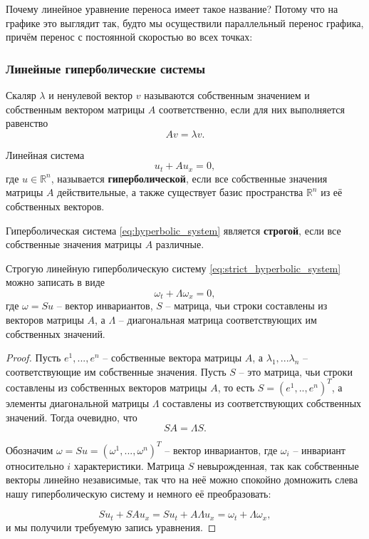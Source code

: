 \documentclass[../main.tex]{subfile}
\begin{document}
Почему линейное уравнение переноса имеет такое название? Потому что на графике
это выглядит так, будто мы осуществили параллельный перенос графика, причём
перенос с постоянной скоростью во всех точках: \\



\subsubsection{Линейные гиперболические системы}
\begin{define}
	Скаляр $\lambda$ и ненулевой вектор $v$ называются собственным
	значением и собственным вектором матрицы $A$ соответственно, если для
	них выполняется равенство
	\[Av=\lambda v.\]
\end{define}

\begin{define}\label{eq:hyperbolic_system}
	Линейная система \[u_t+Au_x=0,\]
	где $u\in \mathbb R^n$, называется \textbf{гиперболической}, если все
	собственные значения матрицы $A$ действительные, а также существует
	базис пространства $\mathbb R^n$ из её собственных векторов.
\end{define}

\begin{define}\label{eq:strict_hyperbolic_system}
	Гиперболическая система \eqref{eq:hyperbolic_system} является
	\textbf{строгой}, если все собственные значения матрицы $A$ различные.
\end{define}

\begin{lemma}\label{eq:hyperbolic_invariant_form}
	Строгую линейную гиперболическую систему
	\eqref{eq:strict_hyperbolic_system} можно записать в виде
	\[\boxed{\omega_t+\Lambda\omega_x=0},\]
	где $\omega=Su$ -- вектор инвариантов, $S$ -- матрица, чьи строки
	составлены из векторов матрицы $A$, а $\Lambda$ -- диагональная матрица
	соответствующих им собственных значений.
\end{lemma}

\begin{proof}
	Пусть $e^1,...,e^n$ -- собственные вектора матрицы $A$, а $\lambda_1,...
	\lambda_n$ -- соответствующие им собственные значения. Пусть $S$ -- это
	матрица, чьи строки составлены из собственных векторов матрицы $A$, то
	есть $S=(e^1,..,e^n)^T$, а элементы диагональной матрицы $\Lambda$
	составлены из соответствующих собственных значений. Тогда очевидно, что
	\[SA=\Lambda S.\]

	Обозначим $\omega=Su=(\omega^1,...,\omega^n)^T$ -- вектор инвариантов,
	где $\omega_i$ -- инвариант относительно $i$ характеристики. Матрица $S$
	невырожденная, так как собственные векторы линейно независимые, так что
	на неё можно спокойно домножить слева нашу гиперболическую систему
	и немного её преобразовать:

	\[Su_t+SAu_x=Su_t+A\Lambda u_x=\omega_t+\Lambda\omega_x,\]
	и мы получили требуемую запись уравнения.
\end{proof}
\end{document}
